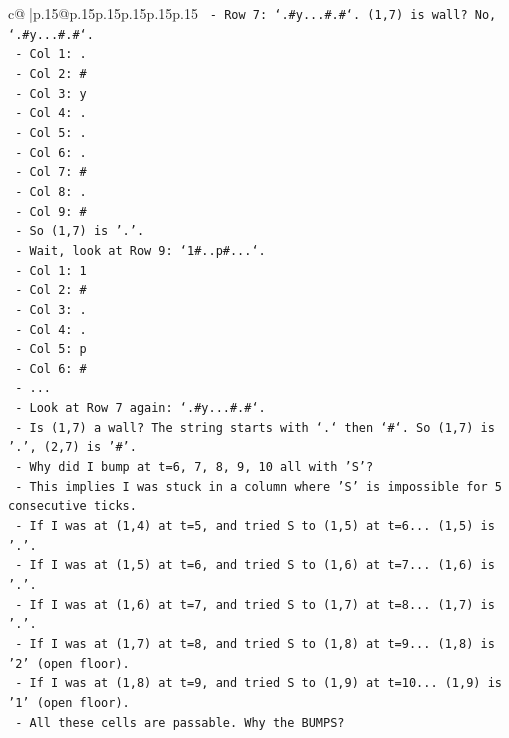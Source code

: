 \documentclass{article}
\begin{document}
{\begin{supertabular}{c@{$\;$}|p{.15\linewidth}@{}p{.15\linewidth}p{.15\linewidth}p{.15\linewidth}p{.15\linewidth}p{.15\linewidth}}
{{{\texttt{  {-} Row 7: `.\#y...\#.\#`. (1,7) is wall? No, `.\#y...\#.\#`.} \\
\texttt{    {-} Col 1: .} \\
\texttt{    {-} Col 2: \#} \\
\texttt{    {-} Col 3: y} \\
\texttt{    {-} Col 4: .} \\
\texttt{    {-} Col 5: .} \\
\texttt{    {-} Col 6: .} \\
\texttt{    {-} Col 7: \#} \\
\texttt{    {-} Col 8: .} \\
\texttt{    {-} Col 9: \#} \\
\texttt{    {-} So (1,7) is '.'.} \\
\texttt{  {-} Wait, look at Row 9: `1\#..p\#...`.} \\
\texttt{    {-} Col 1: 1} \\
\texttt{    {-} Col 2: \#} \\
\texttt{    {-} Col 3: .} \\
\texttt{    {-} Col 4: .} \\
\texttt{    {-} Col 5: p} \\
\texttt{    {-} Col 6: \#} \\
\texttt{    {-} ...} \\
\texttt{  {-} Look at Row 7 again: `.\#y...\#.\#`.} \\
\texttt{    {-} Is (1,7) a wall? The string starts with `.` then `\#`. So (1,7) is '.', (2,7) is '\#'.} \\
\texttt{  {-} Why did I bump at t=6, 7, 8, 9, 10 all with 'S'?} \\
\texttt{  {-} This implies I was stuck in a column where 'S' is impossible for 5 consecutive ticks.} \\
\texttt{  {-} If I was at (1,4) at t=5, and tried S to (1,5) at t=6... (1,5) is '.'.} \\
\texttt{  {-} If I was at (1,5) at t=6, and tried S to (1,6) at t=7... (1,6) is '.'.} \\
\texttt{  {-} If I was at (1,6) at t=7, and tried S to (1,7) at t=8... (1,7) is '.'.} \\
\texttt{  {-} If I was at (1,7) at t=8, and tried S to (1,8) at t=9... (1,8) is '2' (open floor).} \\
\texttt{  {-} If I was at (1,8) at t=9, and tried S to (1,9) at t=10... (1,9) is '1' (open floor).} \\
\texttt{  {-} All these cells are passable. Why the BUMPS?} \\
}}}
\end{supertabular}}
\end{document}
